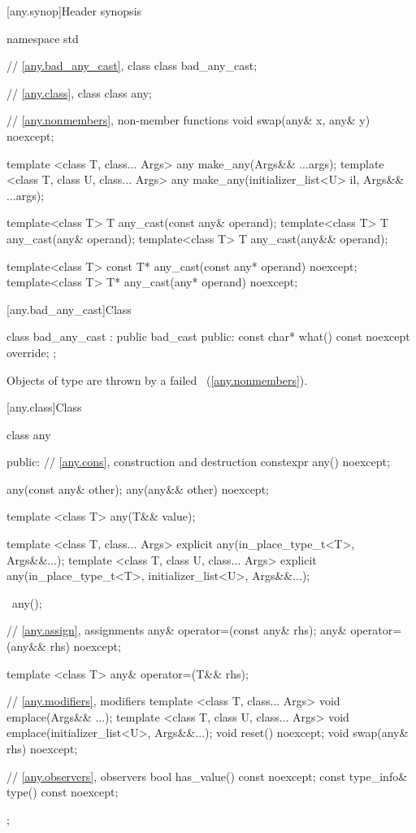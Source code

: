 [any.synop]{Header  synopsis}

%
%

\begin{codeblock}
namespace std {
  // \ref{any.bad_any_cast}, class 
  class bad_any_cast;

  // \ref{any.class}, class 
  class any;

  // \ref{any.nonmembers}, non-member functions
  void swap(any& x, any& y) noexcept;

  template <class T, class... Args>
    any make_any(Args&& ...args);
  template <class T, class U, class... Args>
    any make_any(initializer_list<U> il, Args&& ...args);

  template<class T>
    T any_cast(const any& operand);
  template<class T>
    T any_cast(any& operand);
  template<class T>
    T any_cast(any&& operand);

  template<class T>
    const T* any_cast(const any* operand) noexcept;
  template<class T>
    T* any_cast(any* operand) noexcept;
}
\end{codeblock}

[any.bad_any_cast]{Class }

%
\begin{codeblock}
class bad_any_cast : public bad_cast {
public:
  const char* what() const noexcept override;
};
\end{codeblock}

\pnum
Objects of type  are thrown by a failed ~(\ref{any.nonmembers}).

[any.class]{Class }

\begin{codeblock}
class any {
public:
  // \ref{any.cons}, construction and destruction
  constexpr any() noexcept;

  any(const any& other);
  any(any&& other) noexcept;

  template <class T> any(T&& value);

  template <class T, class... Args>
    explicit any(in_place_type_t<T>, Args&&...);
  template <class T, class U, class... Args>
    explicit any(in_place_type_t<T>, initializer_list<U>, Args&&...);

  ~any();

  // \ref{any.assign}, assignments
  any& operator=(const any& rhs);
  any& operator=(any&& rhs) noexcept;

  template <class T> any& operator=(T&& rhs);

  // \ref{any.modifiers}, modifiers
  template <class T, class... Args>
    void emplace(Args&& ...);
  template <class T, class U, class... Args>
    void emplace(initializer_list<U>, Args&&...);
  void reset() noexcept;
  void swap(any& rhs) noexcept;

  // \ref{any.observers}, observers
  bool has_value() const noexcept;
  const type_info& type() const noexcept;
};
\end{codeblock}

